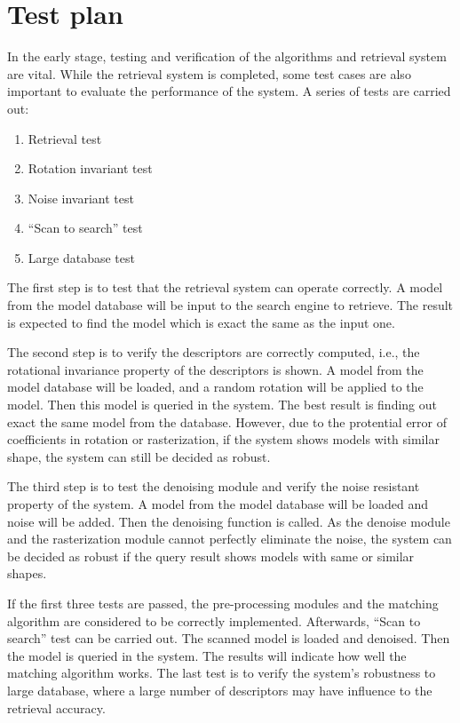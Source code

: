\section{Test plan} \label{sec:test}

In the early stage, testing and verification of the algorithms and retrieval system are vital. While the retrieval system is completed, some test cases are also important to evaluate the performance of the system. A series of tests are carried out:

\begin{enumerate}[1)]
\item Retrieval test
\item Rotation invariant test
\item Noise invariant test
\item ``Scan to search'' test
\item Large database test
\end{enumerate}

The first step is to test that the retrieval system can operate correctly. A model from the model database will be input to the search engine to retrieve. The result is expected to find the model which is exact the same as the input one. 

The second step is to verify the descriptors are correctly computed, i.e., the rotational invariance property of the descriptors is shown. A model from the model database will be loaded, and a random rotation will be applied to the model. Then this model is queried in the system. The best result is finding out exact the same model from the database. However, due to the protential error of coefficients in rotation or rasterization, if the system shows models with similar shape, the system can still be decided as robust. 

The third step is to test the denoising module and verify the noise resistant property of the system. A model from the model database will be loaded and noise will be added. Then the denoising function is called. As the denoise module and the rasterization module cannot perfectly eliminate the noise, the system can be decided as robust if the query result shows models with same or similar shapes. 

If the first three tests are passed, the pre-processing modules and the matching algorithm are considered to be correctly implemented. Afterwards, ``Scan to search'' test can be carried out. The scanned model is loaded and denoised. Then the model is queried in the system. The results will indicate how well the matching algorithm works. The last test is to verify the system's robustness to large database, where a large number of descriptors may have influence to the retrieval accuracy. 

